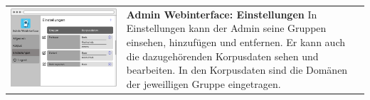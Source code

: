 \begin{tabular}{C{6cm}  L{7cm}}
    \includegraphics[width=\linewidth]{bilder/new vers. UI Design/Einstellungen/Einstellungen (1).png} & \textbf{Admin Webinterface: Einstellungen} \newline
    In Einstellungen kann der Admin seine Gruppen einsehen, hinzufügen und entfernen. Er kann auch
    die dazugehörenden Korpusdaten sehen und bearbeiten. In den Korpusdaten sind die Domänen der jeweilligen Gruppe eingetragen.
\end{tabular}

